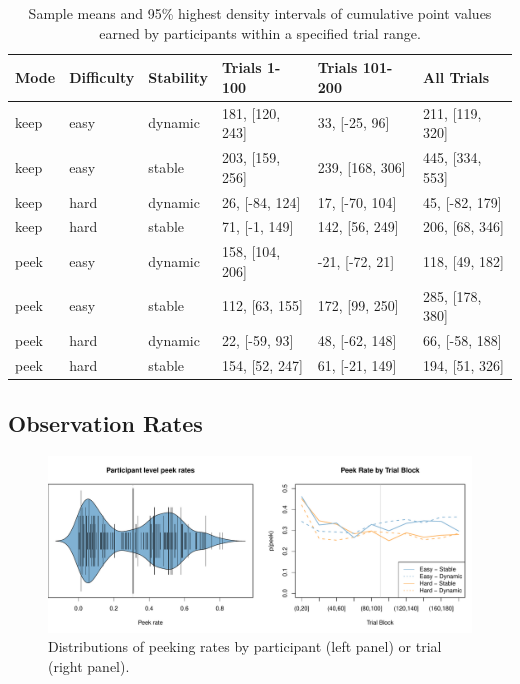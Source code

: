 \documentclass[a4paper,doc,natbib,floatsintext]{apa6}\usepackage[]{graphicx}\usepackage[]{color}
\makeatletter
\def\maxwidth{ %
  \ifdim\Gin@nat@width>\linewidth
    \linewidth
  \else
    \Gin@nat@width
  \fi
}
\newenvironment{knitrout}{}{} %
\makeatother
\begin{document}
\begin{table}[ht]
\centering
\begin{tabular}{llllll}
  \hline
Mode & Difficulty & Stability & Trials 1-100 & Trials 101-200 & All Trials \\ 
  \hline
keep & easy & dynamic & 181, [120, 243] & 33, [-25, 96] & 211, [119, 320] \\ 
  keep & easy & stable & 203, [159, 256] & 239, [168, 306] & 445, [334, 553] \\ 
  keep & hard & dynamic & 26, [-84, 124] & 17, [-70, 104] & 45, [-82, 179] \\ 
  keep & hard & stable & 71, [-1, 149] & 142, [56, 249] & 206, [68, 346] \\ 
  peek & easy & dynamic & 158, [104, 206] & -21, [-72, 21] & 118, [49, 182] \\ 
  peek & easy & stable & 112, [63, 155] & 172, [99, 250] & 285, [178, 380] \\ 
  peek & hard & dynamic & 22, [-59, 93] & 48, [-62, 148] & 66, [-58, 188] \\ 
  peek & hard & stable & 154, [52, 247] & 61, [-21, 149] & 194, [51, 326] \\ 
   \hline
\end{tabular}
\caption{Sample means and 95\% highest density intervals of cumulative point values earned by participants within a specified trial range.} 
\label{table:MeasuresTbl}
\end{table}


\subsection{Observation Rates}

\begin{figure}
\centering
\begin{knitrout}
\color{fgcolor}
\includegraphics[width=\maxwidth]{figure/unnamed-chunk-15-1} 

\end{knitrout}
\caption{\label{fig:peekdistributions}Distributions of peeking rates by participant (left panel) or trial (right panel).}
\end{figure}
\end{document}
